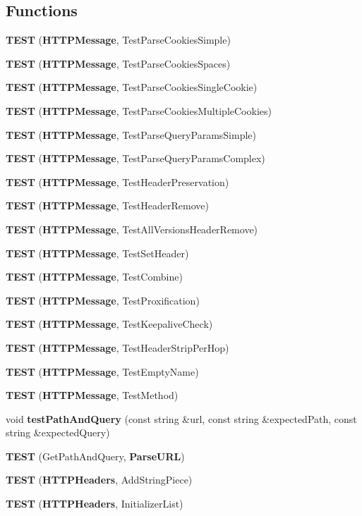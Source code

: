 \subsection*{Functions}
\begin{DoxyCompactItemize}
\item 
{\bf T\+E\+ST} ({\bf H\+T\+T\+P\+Message}, Test\+Parse\+Cookies\+Simple)
\item 
{\bf T\+E\+ST} ({\bf H\+T\+T\+P\+Message}, Test\+Parse\+Cookies\+Spaces)
\item 
{\bf T\+E\+ST} ({\bf H\+T\+T\+P\+Message}, Test\+Parse\+Cookies\+Single\+Cookie)
\item 
{\bf T\+E\+ST} ({\bf H\+T\+T\+P\+Message}, Test\+Parse\+Cookies\+Multiple\+Cookies)
\item 
{\bf T\+E\+ST} ({\bf H\+T\+T\+P\+Message}, Test\+Parse\+Query\+Params\+Simple)
\item 
{\bf T\+E\+ST} ({\bf H\+T\+T\+P\+Message}, Test\+Parse\+Query\+Params\+Complex)
\item 
{\bf T\+E\+ST} ({\bf H\+T\+T\+P\+Message}, Test\+Header\+Preservation)
\item 
{\bf T\+E\+ST} ({\bf H\+T\+T\+P\+Message}, Test\+Header\+Remove)
\item 
{\bf T\+E\+ST} ({\bf H\+T\+T\+P\+Message}, Test\+All\+Versions\+Header\+Remove)
\item 
{\bf T\+E\+ST} ({\bf H\+T\+T\+P\+Message}, Test\+Set\+Header)
\item 
{\bf T\+E\+ST} ({\bf H\+T\+T\+P\+Message}, Test\+Combine)
\item 
{\bf T\+E\+ST} ({\bf H\+T\+T\+P\+Message}, Test\+Proxification)
\item 
{\bf T\+E\+ST} ({\bf H\+T\+T\+P\+Message}, Test\+Keepalive\+Check)
\item 
{\bf T\+E\+ST} ({\bf H\+T\+T\+P\+Message}, Test\+Header\+Strip\+Per\+Hop)
\item 
{\bf T\+E\+ST} ({\bf H\+T\+T\+P\+Message}, Test\+Empty\+Name)
\item 
{\bf T\+E\+ST} ({\bf H\+T\+T\+P\+Message}, Test\+Method)
\item 
void {\bf test\+Path\+And\+Query} (const string \&url, const string \&expected\+Path, const string \&expected\+Query)
\item 
{\bf T\+E\+ST} (Get\+Path\+And\+Query, {\bf Parse\+U\+RL})
\item 
{\bf T\+E\+ST} ({\bf H\+T\+T\+P\+Headers}, Add\+String\+Piece)
\item 
{\bf T\+E\+ST} ({\bf H\+T\+T\+P\+Headers}, Initializer\+List)

\end{DoxyCompactItemize}
